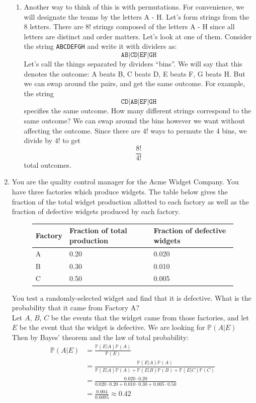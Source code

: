 \documentclass[12pt]{article}
\def\P{{\mathbb P}}
\begin{document}
\begin{enumerate}
\begin{enumerate}
\item Another way to think of this is with permutations. For convenience, we will designate the teams by the letters A - H. Let's form strings from the 8 letters. There are $8!$ strings composed of the letters A - H since all letters are distinct and order matters. Let's look at one of them. Consider the string \texttt{ABCDEFGH} and write it with dividers as:
\[
\texttt{AB}|\texttt{CD}|\texttt{EF}|\texttt{GH}
\]
Let's call the things separated by dividers ``bins''. We will say that this denotes the outcome: A beats B, C beats D, E beats F, G beats H. But we can swap around the pairs, and get the same outcome. For example, the string
\[
\texttt{CD}|\texttt{AB}|\texttt{EF}|\texttt{GH}
\]
specifies the same outcome. How many different strings correspond to the same outcome? We can swap around the bins however we want without affecting the outcome. Since there are $4!$ ways to permute the 4 bins, we divide by $4!$ to get
\[
\frac{8!}{4!}
\]
total outcomes.

\end{enumerate}

\item You are the quality control manager for the Acme Widget Company. You have three factories which produce widgets. The table below gives the fraction of the total widget production allotted to each factory as well as the fraction of defective widgets produced by each factory.

\begin{figure}[H]
\centering
\begin{tabular}{lll}
\toprule
Factory & Fraction of total production & Fraction of defective widgets \\
\midrule
A & 0.20 & 0.020 \\
B & 0.30 & 0.010 \\
C & 0.50 & 0.005 \\
\bottomrule
\end{tabular}
\end{figure}
You test a randomly-selected widget and find that it is defective. What is the probability that it came from Factory A?\\

Let $A$, $B$, $C$ be the events that the widget came from those factories, and let $E$ be the event that the widget is defective. We are looking for $\P(A|E)$ Then by Bayes' theorem and the law of total probability:
\begin{align*}
\P(A|E) &= \frac{ \P(E|A)\P(A) } { \P(E)} \\
&= \frac{ \P(E|A)\P(A) }{\P(E|A)\P(A) + \P(E|B)\P(B) + \P(E|C)\P(C) } \\
&= \frac{ 0.020 \cdot 0.20 }{ 0.020 \cdot 0.20 + 0.010 \cdot 0.30 + 0.005 \cdot 0.50 } \\
&= \frac{0.004}{0.0095} \approx 0.42
\end{align*}

\end{enumerate}
\end{document}
